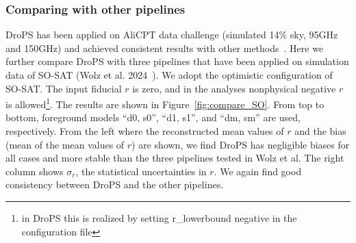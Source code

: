 \documentclass[12pt, a4paper]{ctexart} %
\begin{document}
\subsubsection{Comparing with other pipelines}

DroPS has been applied on AliCPT data challenge (simulated 14\% sky, 95GHz and 150GHz) and achieved consistent results with other methods~\cite{Zhang24}. Here we further compare DroPS with three pipelines that have been applied on simulation data of SO-SAT (Wolz et al. 2024~\cite{SO-SAT}). We adopt the optimistic configuration of SO-SAT. The input fiducial $r$ is zero, and in the analyses nonphysical negative $r$ is allowed\footnote{in DroPS this is realized by setting r\_lowerbound negative in the configuration file}.  The results are shown in Figure~\ref{fig:compare_SO}.  From top to bottom, foreground models ``d0, s0'', ``d1, s1'', and ``dm, sm'' are used, respectively. From the left where the reconstructed mean values of $r$ and the bias (mean of the mean values of $r$) are shown, we find DroPS has negligible biases for all cases and more stable than the three pipelines tested in Wolz et al. The right column shows $\sigma_r$, the statistical uncertainties in $r$. We again find good consistency between DroPS and the other pipelines.
\end{document}
